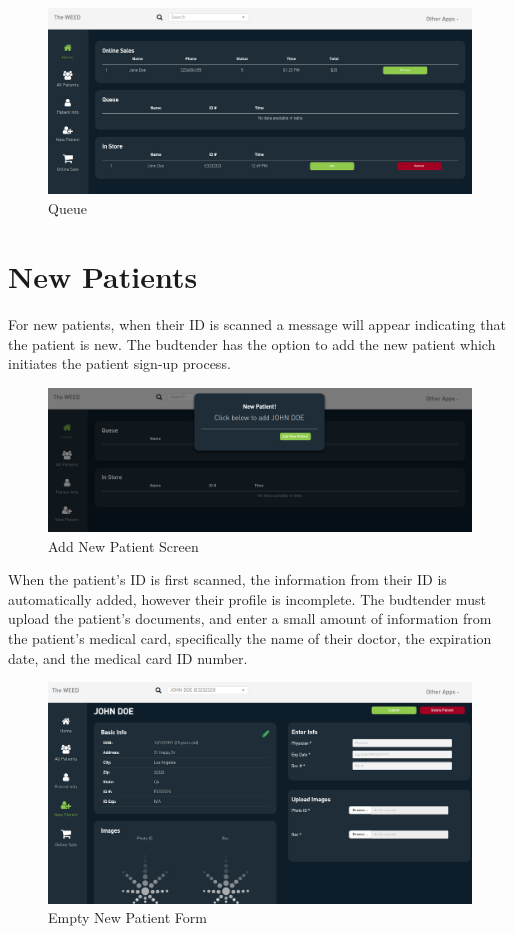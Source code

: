\documentclass[]{book}
\theoremstyle{definition}
\theoremstyle{definition}
\theoremstyle{definition}
\theoremstyle{remark}
\begin{document}
\begin{figure}
\centering
\includegraphics{images/queue.png}
\caption{Queue}
\end{figure}

\section{New Patients}\label{new-patients}

For new patients, when their ID is scanned a message will appear
indicating that the patient is new. The budtender has the option to add
the new patient which initiates the patient sign-up process.

\begin{figure}
\centering
\includegraphics{images/addnew.png}
\caption{Add New Patient Screen}
\end{figure}

When the patient's ID is first scanned, the information from their ID is
automatically added, however their profile is incomplete. The budtender
must upload the patient's documents, and enter a small amount of
information from the patient's medical card, specifically the name of
their doctor, the expiration date, and the medical card ID number.

\begin{figure}
\centering
\includegraphics{images/newPatient.png}
\caption{Empty New Patient Form}
\end{figure}
\end{document}
